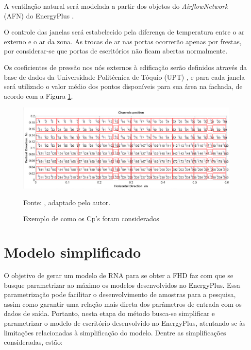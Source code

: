 \documentclass[brazil,hardcopy,openany,a5paper]{ufscthesis}
\begin{document}
		A ventilação natural será modelada a partir dos objetos do \textit{AirflowNetwork} (AFN) do EnergyPlus \cite{EnergyPlus2018}.
		
		O controle das janelas será estabelecido pela diferença de temperatura entre o ar externo e o ar da zona. As trocas de ar nas portas ocorrerão apenas por frestas, por considerar-se que portas de escritórios não ficam abertas normalmente.
		
		Os coeficientes de pressão nos nós externos à edificação serão definidos através da base de dados da Universidade Politécnica de Tóquio (UPT) \cite{TPU2018}, e para cada janela será utilizado o valor médio dos pontos disponíveis para sua área na fachada, de acordo com a Figura \ref{fig:tpuwindows}.
		
		\begin{figure}[h]
			\centering
			\caption{Exemplo de como os Cp’s foram considerados}
			\includegraphics[width=1\linewidth]{img/tpu_windows.png}
			\label{fig:tpuwindows}
			\begin{flushleft}
				Fonte:  \cite{TPU2018}, adaptado pelo autor.
			\end{flushleft}
		\end{figure}
		
		
		\section{Modelo simplificado}
		
		O objetivo de gerar um modelo de RNA para se obter a FHD faz com que se busque parametrizar ao máximo os modelos desenvolvidos no EnergyPlus. Essa parametrização pode facilitar o desenvolvimento de amostras para a pesquisa, assim como garantir uma relação mais direta dos parâmetros de entrada com os dados de saída. Portanto, nesta etapa do método busca-se simplificar e parametrizar o modelo de escritório desenvolvido no EnergyPlus, atentando-se às limitações relacionadas à simplificação do modelo.
		Dentre as simplificações consideradas, estão:
		
\end{document}
